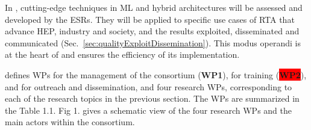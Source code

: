 In \acronym, cutting-edge techniques in ML and hybrid architectures will be assessed and developed by the ESRs. They will be applied to specific use cases of RTA that advance HEP, industry and society, and the results exploited, disseminated and communicated (Sec.~\ref{sec:qualityExploitDissemination}). This modus operandi is at the heart of \acronym and ensures the efficiency of its implementation. 

\acronym defines WPs for the management of the consortium (\textbf{{\colorbox{red!70!black}{\color{white}WP1\color{black}}}}), for training (\textbf{\colorbox{red}{WP2}}), and for outreach and dissemination, and four research WPs, corresponding to each of the research topics in the previous section. The WPs are summarized in the Table 1.1. Fig 1. gives a schematic view of the four research WPs and the main actors within the consortium. 

